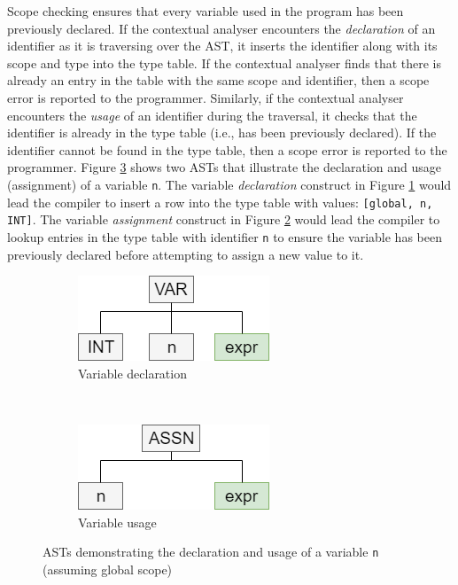 \documentclass{l4proj}
\begin{document}
Scope checking ensures that every variable used in the program has been previously declared. If the contextual analyser encounters the \textit{declaration} of an identifier as it is traversing over the AST, it inserts the identifier along with its scope and type into the type table. If the contextual analyser finds that there is already an entry in the table with the same scope and identifier, then a scope error is reported to the programmer. Similarly, if the contextual analyser encounters the \textit{usage} of an identifier during the traversal, it checks that the identifier is already in the type table (i.e., has been previously declared). If the identifier cannot be found in the type table, then a scope error is reported to the programmer. Figure \ref{fig:variable-decl-use} shows two ASTs that illustrate the declaration and usage (assignment) of a variable \texttt{n}. The variable \textit{declaration} construct in Figure \ref{fig:variable-decl} would lead the compiler to insert a row into the type table with values: \texttt{[global, n, INT]}. The variable \textit{assignment} construct in Figure \ref{fig:variable-use} would lead the compiler to lookup entries in the type table with identifier \texttt{n} to ensure the variable has been previously declared before attempting to assign a new value to it.

\begin{figure}[h]
	\centering
	\begin{subfigure}[b]{0.3\textwidth}
		\includegraphics[scale=0.65]{images/variable-decl.png}
		\caption{Variable declaration}
		\label{fig:variable-decl}
	\end{subfigure}
	~
	\begin{subfigure}[b]{0.3\textwidth}
		\includegraphics[scale=0.65]{images/variable-use.png}
		\caption{Variable usage}
		\label{fig:variable-use}
	\end{subfigure}
	\caption{ASTs demonstrating the declaration and usage of a variable \texttt{n} (assuming global scope)}\label{fig:variable-decl-use}	
\end{figure}
\end{document}
